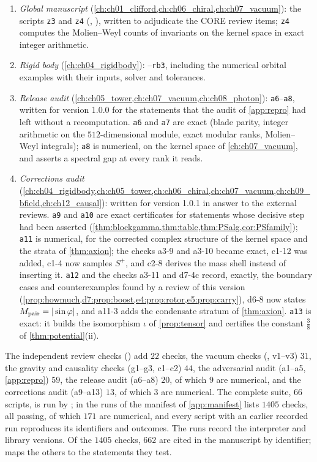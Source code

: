 \begin{enumerate}[label=(\roman*),leftmargin=2.2em]
\item \emph{Global manuscript} (\cref{ch:ch01_clifford,ch:ch06_chiral,ch:ch07_vacuum}): the scripts \texttt{z3} and \texttt{z4} (, ), written to adjudicate the CORE review items; \texttt{z4} computes the Molien--Weyl counts of invariants on the
kernel space in exact integer arithmetic.
\item \emph{Rigid body} (\cref{ch:ch04_rigidbody}): --\texttt{rb3}, including the numerical orbital examples with
their inputs, solver and tolerances.
\item \emph{Release audit} (\cref{ch:ch05_tower,ch:ch07_vacuum,ch:ch08_photon}): \texttt{a6}--\texttt{a8}, written for version 1.0.0 for the statements
that the audit of \cref{app:repro} had left without a recomputation. \texttt{a6} and \texttt{a7} are exact (blade parity, integer arithmetic on the
$512$-dimensional module, exact modular ranks, Molien--Weyl integrals); \texttt{a8} is numerical, on the kernel space of \cref{ch:ch07_vacuum}, and
asserts a spectral gap at every rank it reads.
\item \emph{Corrections audit} (\cref{ch:ch04_rigidbody,ch:ch05_tower,ch:ch06_chiral,ch:ch07_vacuum,ch:ch09_bfield,ch:ch12_causal}): written for version 1.0.1 in
answer to the external reviews. \texttt{a9} and \texttt{a10} are exact certificates for statements whose decisive step had been asserted
(\cref{thm:blockgamma,thm:table,thm:PSalg,cor:PSfamily}); \texttt{a11} is numerical, for the corrected complex structure of the kernel space and
the strata of \cref{thm:axion}; the checks a3-9 and a3-10 became exact, c1-12 was added, c1-4 now samples $S^+$, and c2-8 derives the mass shell
instead of inserting it. \texttt{a12} and the checks a3-11 and d7-4c record, exactly, the boundary cases and counterexamples found by a review of
this version (\cref{prop:howmuch,d7:prop:boost,e4:prop:rotor,e5:prop:carry}), d6-8 now states $M_{\rm pair}=|\sin\varphi|$, and a11-3 adds the
condensate stratum of \cref{thm:axion}. \texttt{a13} is exact: it builds the isomorphism $\iota$ of \cref{prop:tensor} and certifies the constant $\tfrac38$
of \cref{thm:potential}(ii).
\end{enumerate}
The independent review checks () add $22$ checks, the vacuum checks (,
v1--v3) $31$, the gravity and causality checks (g1--g3, c1--c2) $44$, the adversarial audit (a1--a5, \cref{app:repro}) $59$, the release audit
(a6--a8) $20$, of which $9$ are numerical, and the corrections audit (a9--a13) $13$, of which $3$ are numerical. The complete suite, $66$ scripts, is
run by ; in the runs of  the manifest of \cref{app:manifest} lists
$1405$ checks, all passing, of which $171$ are numerical, and every script with an earlier recorded run reproduces its identifiers and outcomes. The
runs record the interpreter and library versions. Of the $1405$ checks, $662$ are cited in the manuscript by identifier; 
maps the others to the statements they test.

